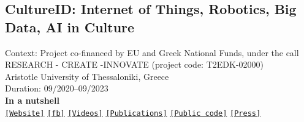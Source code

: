 \subsection{CultureID: Internet of Things, Robotics, Big Data, AI in Culture}

\noindent Context: Project co-financed by EU and Greek National Funds, under the call RESEARCH - CREATE -INNOVATE (project code: T2EDK-02000)\\
\noindent Aristotle University of Thessaloniki, Greece\\
\noindent Duration: 09/2020--09/2023\\

\noindent \textbf{In a nutshell}\\
\noindent \href{https://cultureid.web.auth.gr/?page_id=216&lang=en}{\texttt{[Website]}} \href{https://www.facebook.com/cultureID.Auth}{\texttt{[fb]}} \href{https://www.youtube.com/@cultureidproject}{\texttt{[Videos]}} \href{https://cultureid.web.auth.gr/?page_id=490}{\texttt{[Publications]}} \href{https://github.com/cultureid-auth-ros-packages}{\texttt{[Public code]}} \href{https://www.lifo.gr/now/tech-science/arhaiologiko-moyseio-thessalonikis-ena-rompot-tha-syzita-me-toys-episkeptes}{\texttt{[Press]}}\\


